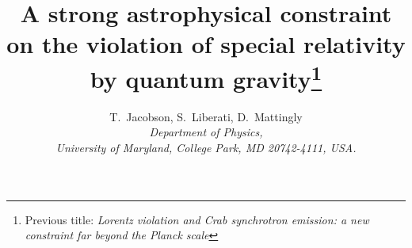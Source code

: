 \documentclass[12pt]{article}
\begin{document}
\title{\bf A strong astrophysical constraint on the
  violation of special relativity by quantum
  gravity\footnote{Previous title:
 {\em Lorentz violation and Crab synchrotron emission:
a new constraint far beyond the Planck scale}}}
\author{T.~Jacobson,
S.~Liberati,
D.~Mattingly
\\[2mm]
{\small \it
Department of Physics,}\\
{\small \it University of Maryland, College Park, MD 20742-4111,
USA.} }
\date{}
\maketitle


\vfill
\def\wt{\widetilde}
\def\gsim{\; \raisebox{-.8ex}{$\stackrel{\textstyle >}{\sim}$}\;}
\def\lsim{\; \raisebox{-.8ex}{$\stackrel{\textstyle <}{\sim}$}\;}
\def\half{{1\over2}}
\def\a{\alpha}
\def\b{\beta}
\def\g{\gamma}
\def\e{\epsilon}
\def\m{\mu}
\def\o{\omega}
\def\L{{\mathcal L}}
\def\d{{\mathrm{d}}}
\def\p{{\mathbf{p}}}
\def\q{{\mathbf{q}}}
\def\k{{\mathbf{k}}}
\def\fp{{p_{\rm 4}}}
\def\fq{{q_{\rm 4}}}
\def\fk{{k_{\rm 4}}}
\def\etal{{\emph{et al}}}
\def\det{{\mathrm{det}}}
\def\tr{{\mathrm{tr}}}
\def\ie{{\emph{i.e.}}}
\def\aka{{\emph{aka}}}
\end{document}
